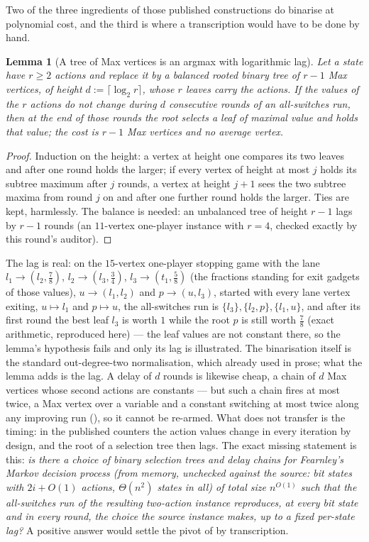 \documentclass[11pt]{article}
\theoremstyle{plain}
\newtheorem{lemma}[theorem]{Lemma}
\theoremstyle{definition}
\begin{document}
Two of the three ingredients of those published constructions do
binarise at polynomial cost, and the third is where a transcription would
have to be done by hand.

\begin{lemma}[A tree of Max vertices is an argmax with logarithmic lag]\label{lem:max-tree}
Let a state have $r\ge2$ actions and replace it by a \emph{balanced}
rooted binary tree of $r-1$ Max vertices, of height
$d:=\lceil\log_2r\rceil$, whose $r$ leaves carry the actions. If the
values of the $r$ actions do not change during $d$ consecutive
rounds of an all-switches run, then at the end of those rounds the root
selects a leaf of maximal value and holds that value; the cost is $r-1$
Max vertices and no average vertex.
\end{lemma}

\begin{proof}
Induction on the height: a vertex at height one compares its two leaves
and after one round holds the larger; if every vertex of height at most
$j$ holds its subtree maximum after $j$ rounds, a vertex at height $j+1$
sees the two subtree maxima from round $j$ on and after one further round
holds the larger. Ties are kept, harmlessly. The balance is needed: an
unbalanced tree of height $r-1$ lags by $r-1$ rounds (an $11$-vertex
one-player instance with $r=4$, checked exactly by this round's auditor).
\end{proof}

The lag is real: on the $15$-vertex one-player stopping game with the
lane $l_1\to(l_2,\tfrac78)$, $l_2\to(l_3,\tfrac34)$, $l_3\to(t_1,\tfrac58)$
(the fractions standing for exit gadgets of those values), $u\to(l_1,l_2)$
and $p\to(u,l_3)$, started with every lane vertex exiting, $u\mapsto l_1$
and $p\mapsto u$, the all-switches run is $\{l_3\},\{l_2,p\},\{l_1,u\}$,
and after its first round the best leaf $l_3$ is worth $1$ while the root
$p$ is still worth $\tfrac78$ (exact arithmetic, reproduced here) --- the
leaf values are not constant there, so the lemma's hypothesis fails and
only its lag is illustrated.
The binarisation itself is the standard out-degree-two normalisation,
which  already used in prose; what the lemma
adds is the lag. A delay of $d$ rounds is likewise cheap, a chain of $d$
Max vertices whose second actions are constants --- but such a chain fires
at most twice, a Max vertex over a variable and a constant switching at
most twice along any improving run (), so it cannot be
re-armed. What does not transfer is the timing: in
the published counters the action values change in every iteration by
design, and the root of a selection tree then lags. The exact missing
statement is this: \emph{is there a choice of binary selection trees and
delay chains for Fearnley's Markov decision process (from memory,
unchecked against the source: bit states with $2i+O(1)$ actions,
$\Theta(n^{2})$ states in all) of total size $n^{O(1)}$ such that the
all-switches run of the resulting two-action instance reproduces, at every
bit state and in every round, the choice the source instance makes, up to
a fixed per-state lag?} A positive answer would settle the pivot of
 by transcription.
\end{document}
